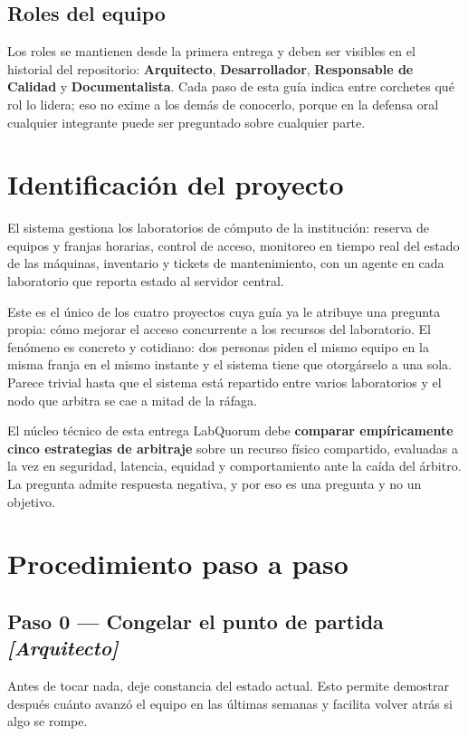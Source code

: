 \documentclass[11pt,a4paper]{article}
\newcommand{\paso}[1]{\subsection{#1}}
\begin{document}
	\subsection{Roles del equipo}
	
	Los roles se mantienen desde la primera entrega y deben ser visibles en el historial del repositorio: \textbf{Arquitecto}, \textbf{Desarrollador}, \textbf{Responsable de Calidad} y \textbf{Documentalista}. Cada paso de esta guía indica entre corchetes qué rol lo lidera; eso no exime a los demás de conocerlo, porque en la defensa oral cualquier integrante puede ser preguntado sobre cualquier parte.
	
	\section{Identificación del proyecto}
	
	El sistema gestiona los laboratorios de cómputo de la institución: reserva de equipos y franjas horarias, control de acceso, monitoreo en tiempo real del estado de las máquinas, inventario y tickets de mantenimiento, con un agente en cada laboratorio que reporta estado al servidor central.
	
	Este es el único de los cuatro proyectos cuya guía ya le atribuye una pregunta propia: cómo mejorar el acceso concurrente a los recursos del laboratorio. El fenómeno es concreto y cotidiano: dos personas piden el mismo equipo en la misma franja en el mismo instante y el sistema tiene que otorgárselo a una sola. Parece trivial hasta que el sistema está repartido entre varios laboratorios y el nodo que arbitra se cae a mitad de la ráfaga.
	
	\begin{defBox}{El núcleo técnico de esta entrega}
		LabQuorum debe \textbf{comparar empíricamente cinco estrategias de arbitraje} sobre un recurso físico compartido, evaluadas a la vez en seguridad, latencia, equidad y comportamiento ante la caída del árbitro. La pregunta admite respuesta negativa, y por eso es una pregunta y no un objetivo.
	\end{defBox}
	
	\section{Procedimiento paso a paso}
	
	\paso{Paso 0 --- Congelar el punto de partida \emph{[Arquitecto]}}
	
	Antes de tocar nada, deje constancia del estado actual. Esto permite demostrar después cuánto avanzó el equipo en las últimas semanas y facilita volver atrás si algo se rompe.
	
\end{document}
